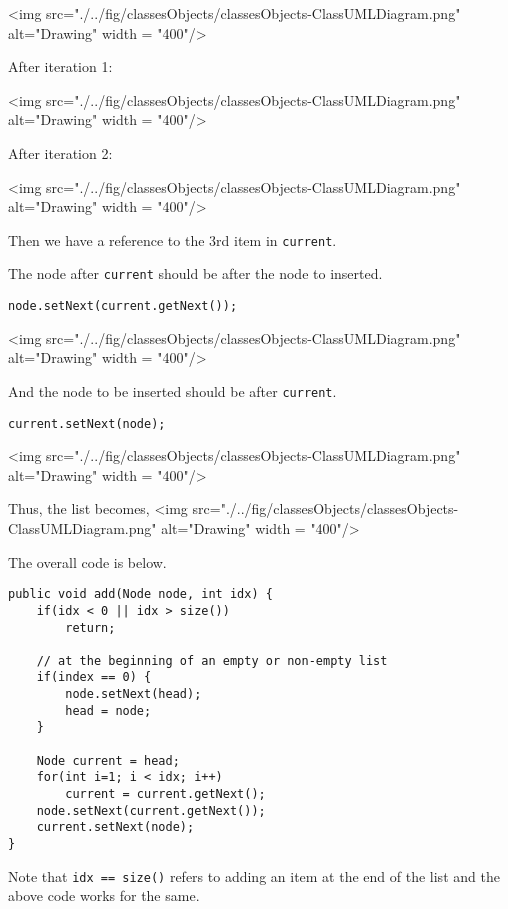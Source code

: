 <img src="./../fig/classesObjects/classesObjects-ClassUMLDiagram.png" alt="Drawing" width = "400"/>

After iteration 1:
\vskip 0.5cm

<img src="./../fig/classesObjects/classesObjects-ClassUMLDiagram.png" alt="Drawing" width = "400"/>

After iteration 2:
\vskip 0.5cm

<img src="./../fig/classesObjects/classesObjects-ClassUMLDiagram.png" alt="Drawing" width = "400"/>

Then we have a reference to the 3rd item in \texttt{current}.

The node after \texttt{current} should be after the node to inserted.

\begin{lstlisting}
node.setNext(current.getNext());
\end{lstlisting}

<img src="./../fig/classesObjects/classesObjects-ClassUMLDiagram.png" alt="Drawing" width = "400"/>

And the node to be inserted should be after \texttt{current}.

\begin{lstlisting}
current.setNext(node);
\end{lstlisting}

<img src="./../fig/classesObjects/classesObjects-ClassUMLDiagram.png" alt="Drawing" width = "400"/>

Thus, the list becomes,
\vskip 0.5cm
<img src="./../fig/classesObjects/classesObjects-ClassUMLDiagram.png" alt="Drawing" width = "400"/>

\newpage

The overall code is below.

\begin{lstlisting}
public void add(Node node, int idx) {
	if(idx < 0 || idx > size()) 
		return;
	
	// at the beginning of an empty or non-empty list
	if(index == 0) { 
		node.setNext(head);
		head = node;
	}
	
	Node current = head;
	for(int i=1; i < idx; i++)
		current = current.getNext();
	node.setNext(current.getNext());
	current.setNext(node);
}
\end{lstlisting}

Note that \texttt{idx == size()} refers to adding an item at the end of the list and the above code works for the same.

\newpage


